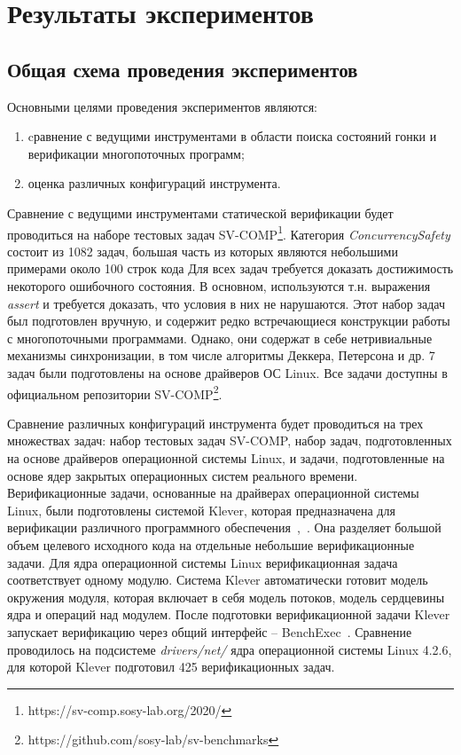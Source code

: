 \chapter{Результаты экспериментов}
\label{chapter_evaluation}


\section{Общая схема проведения экспериментов}

Основными целями проведения экспериментов являются:
\begin{enumerate}
\item cравнение с ведущими инструментами в области поиска состояний гонки и верификации многопоточных программ;
\item оценка различных конфигураций инструмента.
\end{enumerate}

Сравнение с ведущими инструментами статической верификации будет проводиться на наборе тестовых задач SV-COMP\footnote{https://sv-comp.sosy-lab.org/2020/}.
Категория {\em ConcurrencySafety} состоит из 1082 задач, большая часть из которых являются небольшими примерами около 100 строк кода
Для всех задач требуется доказать достижимость некоторого ошибочного состояния. 
В основном, используются т.н. выражения \textit{assert} и требуется доказать, что условия в них не нарушаются. 
Этот набор задач был подготовлен вручную, и содержит редко встречающиеся конструкции работы с многопоточными программами.
Однако, они содержат в себе нетривиальные механизмы синхронизации, в том числе алгоритмы Деккера, Петерсона и др.
7 задач были подготовлены на основе драйверов ОС Linux. Все задачи доступны в официальном репозитории SV-COMP\footnote{https://github.com/sosy-lab/sv-benchmarks}.

Сравнение различных конфигураций инструмента будет проводиться на трех множествах задач: набор тестовых задач SV-COMP, набор задач, подготовленных на основе драйверов операционной системы Linux, и задачи, подготовленные на основе ядер закрытых операционных систем реального времени.
Верификационные задачи, основанные на драйверах операционной системы Linux, были подготовлены системой Klever, которая предназначена для верификации различного программного обеспечения~\cite{kleverPsi},~\cite{kleverIsola}.
Она разделяет большой объем целевого исходного кода на отдельные небольшие верификационные задачи.
Для ядра операционной системы Linux верификационная задача соответствует одному модулю.
Система Klever автоматически готовит модель окружения модуля, которая включает в себя модель потоков, модель сердцевины ядра и операций над модулем.
После подготовки верификационной задачи Klever запускает верификацию через общий интерфейс -- BenchExec~\cite{benchexec2019}.
Сравнение проводилось на подсистеме \textit{drivers/net/} ядра операционной системы Linux 4.2.6, для которой Klever подготовил 425 верификационных задач.

